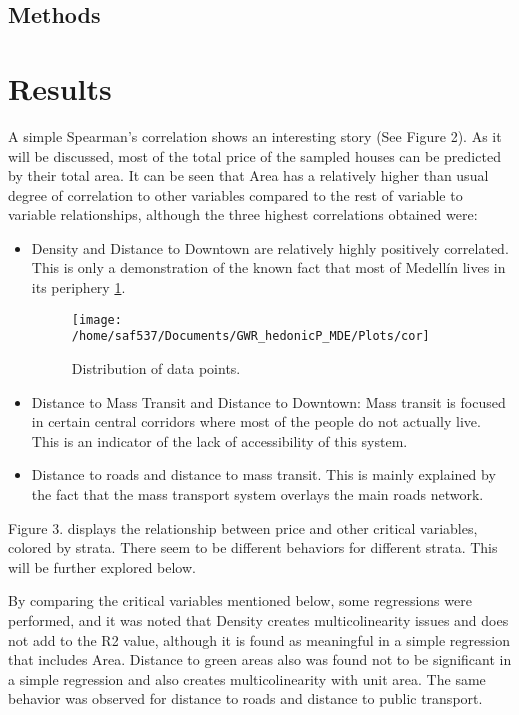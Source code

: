 \documentclass[journal]{IEEEtran}
\begin{document}
\subsection{Methods}


\section{Results}

A simple Spearman’s correlation shows an interesting story (See Figure 2). As it will be discussed, most of the total price of the sampled
houses can be predicted by their total area. It can be seen that Area has a relatively higher than usual degree of correlation to other variables compared to the rest of variable to variable relationships,
although the three highest correlations obtained were:

\begin{itemize}
\item Density and Distance to Downtown are relatively highly positively correlated. This is only a demonstration of the known fact that most of Medellín lives in its periphery \ref{cor}.

\begin{figure}[!t]
\centering
\texttt{[image: /home/saf537/Documents/GWR\_hedonicP\_MDE/Plots/cor]}
\caption{Distribution of data points.}
\label{cor}
\end{figure}

\item Distance to Mass Transit and Distance to Downtown: Mass transit is focused in certain central corridors where most of the people do not actually live. This is an indicator of the lack of accessibility of this system.

\item Distance to roads and distance to mass transit. This is mainly explained by the fact that the mass transport system overlays the main roads network.

\end{itemize}

Figure 3. displays the relationship between price and other critical variables, colored by strata. There seem to be different behaviors for different strata. This will be further explored below.

By comparing the critical variables mentioned below, some regressions were performed, and it was noted that Density creates multicolinearity issues and does not add to the R2 value, although it is found as
meaningful in a simple regression that includes Area. Distance to green areas also was found not to be significant in a simple regression and also creates multicolinearity with unit area. The same behavior was observed for distance to roads and distance to
public transport.
\end{document}
